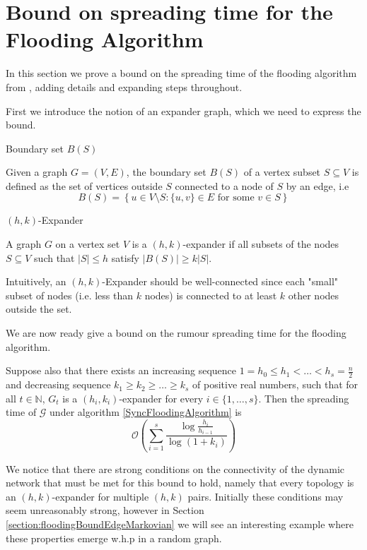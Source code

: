 \section{Bound on spreading time for the Flooding Algorithm}

In this section we prove a bound on the spreading time of the flooding algorithm from \cite{syncPaper}, adding details and expanding steps throughout.

First we introduce the notion of an expander graph, which we need to express the bound.

\begin{definition}
	Boundary set $B(S)$

	\noindent 
	Given a graph $G=(V,E)$, the boundary set $B(S)$ of a vertex subset $S \subseteq V$ is defined as the set of vertices outside $S$ connected to a node of $S$ by an edge, i.e
	$$
		B(S) = \left\{u \in V \setminus S : \{u, v\} \in E \text{ for some } v \in S \right\}
	$$
\end{definition}

\begin{definition}
	$(h, k)$-Expander

	\noindent
	A graph $G$ on a vertex set $V$ is a $(h, k)$-expander if all subsets of the nodes $S \subseteq V$ such that $|S| \leq h$ satisfy $|B(S)| \geq k|S|$.
\end{definition}

Intuitively, an $(h, k)$-Expander should be well-connected since each "small" subset of nodes (i.e. less than $k$ nodes) is connected to at least $k$ other nodes outside the set.  

We are now ready give a bound on the rumour spreading time for the flooding algorithm.

\begin{theorem}\label{theorem:DeterministicFloodingBound}
	\ModelIntro Suppose also that there exists an increasing sequence $1 = h_0 \leq h_1 < \dots < h_s = \frac{n}{2}$ and decreasing sequence $k_1 \geq k_2 \geq \dots \geq k_s$ of positive real numbers, such that for all $t \in \mathbb{N}$, $G_t$ is a $(h_i, k_i)$-expander for every $i \in \{1, \dots , s\}$. Then the spreading time of $\mathcal{G}$ under algorithm \ref{SyncFloodingAlgorithm} is
	$$
		\mathcal{O}\left(\sum_{i=1}^s \frac{\log \frac{h_i}{h_{i-1}}}{\log(1+k_i)}\right)
	$$
\end{theorem}

We notice that there are strong conditions on the connectivity of the dynamic network that must be met for this bound to hold, namely that every topology is an $(h,k)$-expander for multiple $(h, k)$ pairs. Initially these conditions may seem unreasonably strong, however in Section \ref{section:floodingBoundEdgeMarkovian} we will see an interesting example where these properties emerge w.h.p in a random graph.

